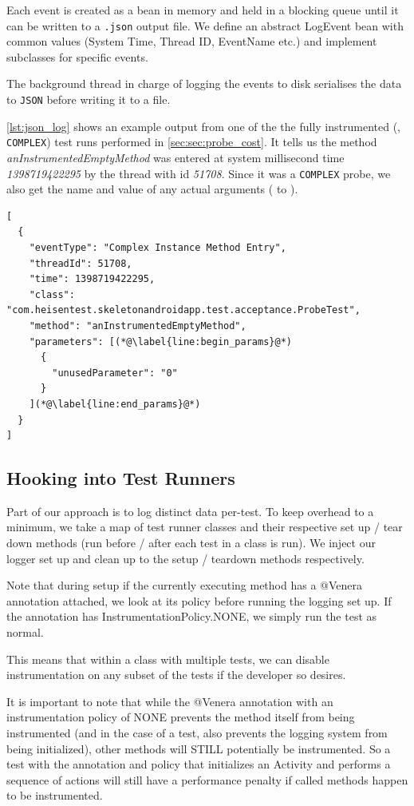 Each event is created as a bean in memory and held in a blocking queue until it
can be written to a {\tt .json} output file. We define an abstract LogEvent bean
with common values (System Time, Thread ID, EventName etc.) and implement
subclasses for specific events.

The background thread in charge of logging the events to disk serialises the
data to {\tt JSON} before writing it to a file.

\autoref{lst:json_log} shows an example output from one of the the fully
instrumented (\ie, {\tt COMPLEX}) test runs performed in
\autoref{sec:sec:probe_cost}. It tells us the method
\textit{anInstrumentedEmptyMethod} was entered at system millisecond time
\textit{1398719422295} by the thread with id \textit{51708}. Since it was a
{\tt COMPLEX} probe, we also get the name and value of any actual arguments
( to ).

\begin{lstlisting}[label=lst:json_log]
[
  {
    "eventType": "Complex Instance Method Entry",
    "threadId": 51708,
    "time": 1398719422295,
    "class": "com.heisentest.skeletonandroidapp.test.acceptance.ProbeTest",
    "method": "anInstrumentedEmptyMethod",
    "parameters": [(*@\label{line:begin_params}@*)
      {
        "unusedParameter": "0"
      }
    ](*@\label{line:end_params}@*)
  }
]
\end{lstlisting}

\subsection{Hooking into Test Runners}

Part of our approach is to log distinct data per-test. To keep overhead to a
minimum, we take a map of test runner classes and their respective set up / tear
down methods (run before / after each test in a class is run). We inject our
logger set up and clean up to the setup / teardown methods respectively.

Note that during setup if the currently executing method has a @Venera
annotation attached, we look at its policy before running the logging set up. If
the annotation has InstrumentationPolicy.NONE, we simply run the test as normal.

This means that within a class with multiple tests, we can disable
instrumentation on any subset of the tests if the developer so desires.

It is important to note that while the @Venera annotation with an
instrumentation policy of NONE prevents the method itself from being
instrumented (and in the case of a test, also prevents the logging system from
being initialized), other methods will STILL potentially be instrumented. So a
test with the annotation and policy that initializes an Activity and performs a
sequence of actions will still have a performance penalty if called methods
happen to be instrumented.


